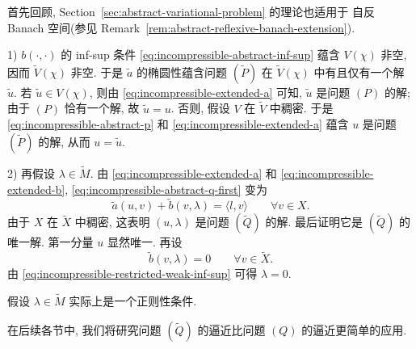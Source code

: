 \begin{Proof}
首先回顾, Section~\ref{sec:abstract-variational-problem} 的理论也适用于
自反 Banach 空间(参见
Remark~\ref{rem:abstract-reflexive-banach-extension}).

\textup{1)} $b(\cdot,\cdot)$ 的 inf-sup 条件
\eqref{eq:incompressible-abstract-inf-sup}
蕴含 $V(\chi)$ 非空, 因而 $\widetilde V(\chi)$ 非空.
于是 $\widetilde a$ 的椭圆性蕴含问题 $(\widetilde P)$
在 $\widetilde V(\chi)$ 中有且仅有一个解 $\widetilde u$.
若 $\widetilde u\in V(\chi)$, 则由
\eqref{eq:incompressible-extended-a} 可知,
$\widetilde u$ 是问题 $(P)$ 的解; 由于 $(P)$ 恰有一个解,
故 $\widetilde u=u$.
否则, 假设 $V$ 在 $\widetilde V$ 中稠密.
于是 \eqref{eq:incompressible-abstract-p}
和 \eqref{eq:incompressible-extended-a} 蕴含
$u$ 是问题 $(\widetilde P)$ 的解, 从而 $u=\widetilde u$.

\textup{2)} 再假设 $\lambda\in\widetilde M$.
由 \eqref{eq:incompressible-extended-a}
和 \eqref{eq:incompressible-extended-b},
\eqref{eq:incompressible-abstract-q-first} 变为
\[
\widetilde a(u,v)+\widetilde b(v,\lambda)
=\langle l,v\rangle
\qquad\forall v\in X.
\]
由于 $X$ 在 $\widetilde X$ 中稠密,
这表明 $(u,\lambda)$ 是问题 $(\widetilde Q)$ 的解.
最后证明它是 $(\widetilde Q)$ 的唯一解.
第一分量 $u$ 显然唯一. 再设
\[
\widetilde b(v,\lambda)=0
\qquad\forall v\in\widetilde X.
\]
由 \eqref{eq:incompressible-restricted-weak-inf-sup}
可得 $\lambda=0$.
\end{Proof}

\begin{Remark}\label{rem:incompressible-lambda-regularity}
假设 $\lambda\in\widetilde M$ 实际上是一个正则性条件.
\end{Remark}

在后续各节中, 我们将研究问题 $(\widetilde Q)$ 的逼近比问题 $(Q)$
的逼近更简单的应用.
